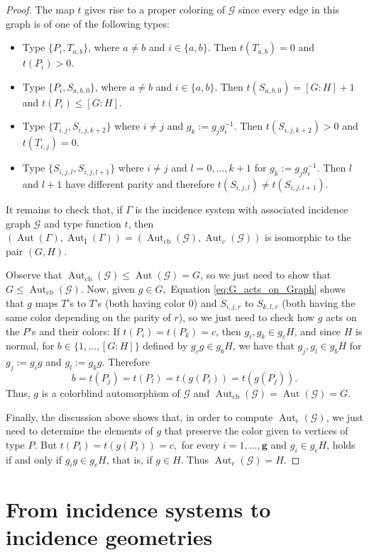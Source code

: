 \documentclass{amsart}
\theoremstyle{definition}
\theoremstyle{remark}
\newcommand{\Aut}{\operatorname{Aut}}
\newcommand{\AutI}{\Aut_{\text{I}}}
\newcommand{\Autcb}{\Aut_{\text{cb}}}
\newcommand{\Autc}{\Aut_{\text{c}}}
\newcommand{\G}{\mathcal{G}}
\begin{document}
\begin{proof}
The map $t$ gives rise to a proper coloring of $\mathcal{G}$ since every edge in this graph is of one of the following types:
\begin{itemize}[label={--}]
    \item Type $\{P_i, T_{a,b}\}$, where $a\ne b$ and $i\in\{a,b\}$. Then $t(T_{a,b})=0$ and $t(P_i)>0.$

    \item Type $\{P_i, S_{a,b,0}\}$, where $a\ne b$ and $i\in\{a,b\}$. Then $t(S_{a,b,0})=[G:H]+1$ and $t(P_i)\leq [G:H].$

    \item Type $\{T_{i,j}, S_{i,j,k+2}\}$ where $i\ne j$ and $g_k:=g_jg_i^{-1}$. Then $t(S_{i,j,k+2})>0$ and $t(T_{i,j})=0.$

    \item Type $\{S_{i,j,l}, S_{i,j,l+1}\}$ where $i\ne j$ and $l=0,\ldots,k+1$ for $g_k:=g_jg_i^{-1}$. Then $l$ and $l+1$ have different parity and therefore $t(S_{i,j,l})\ne t(S_{i,j,l+1}).$
\end{itemize} 

It remains to check that, if $\Gamma$ is the incidence system with associated incidence graph $\mathcal{G}$ and type function $t$, then  $(\Aut(\Gamma),\AutI(\Gamma))=(\Autcb(\G),\Autc(\G))$ is isomorphic to the pair $(G,H)$.

Observe that $\Autcb(\G)\leq \Aut(\G)=G$, so we just need to show that $G\leq \Autcb(\G).$ Now, given $g\in G,$ Equation \eqref{eq:G_acts_on_Graph} shows that $g$ maps $T$'s to $T$'s (both having color $0$) and $S_{i,j,r}$ to $S_{k,l,r}$ (both having the same color depending on the parity of $r$), so we just need to check how $g$ acts on the $P$'s and their colors: If $t(P_i)=t(P_k)=c$, then $g_i,g_k\in g_cH$, and since $H$ is normal, for $b\in\{1,\ldots,[G:H]\}$ defined by $g_cg\in g_bH$, we have that $g_j,g_l\in g_bH$ for $g_j:=g_ig$ and $g_l:=g_kg$. Therefore 
$$b=t(P_j)=t(P_l)=t(g(P_i))=t(g(P_j)).$$
Thus, $g$ is a colorblind automorphism of $\G$ and $\Autcb(\G)= \Aut(\G)=G$.

Finally, the discussion above shows that, in order to compute $\Autc(\G)$, we just need to determine the elements of $g$ that preserve the color given to vertices of type $P$. But $t(P_i)=t(g(P_i))=c,$ for every $i=1,\ldots,\mathbf{g}$ and $g_i\in g_cH$, holds if and only if $g_ig\in g_cH$, that is, if $g\in H.$ Thus $\Autc(\G)=H.$ 
\end{proof}



\section{From incidence systems to incidence geometries}\label{sec:systems to geometries}
\end{document}
